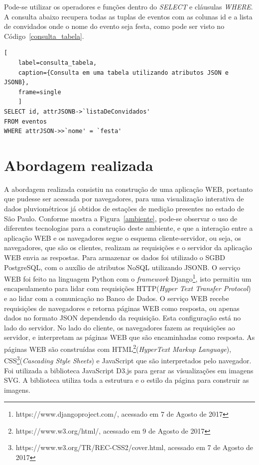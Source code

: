 \documentclass[article,11pt,oneside,a4paper]{abntex2} %
\begin{document}
	Pode-se utilizar os operadores e funções dentro do \textit{SELECT} e cláusulas \textit{WHERE}. A consulta abaixo recupera todas as tuplas de eventos com as colunas id e a lista de convidados onde o nome do evento seja festa, como pode ser visto no Código~\ref{consulta_tabela}.
	
	\begin{lstlisting}[
	label=consulta_tabela,
	caption={Consulta em uma tabela utilizando atributos JSON e JSONB},
	frame=single
	]
SELECT id, attrJSONB->`listaDeConvidados' 
FROM eventos 
WHERE attrJSON->>`nome' = `festa'
	\end{lstlisting}
	
	\section{Abordagem realizada}
		\hspace{13pt}
	A abordagem realizada consistiu na construção de uma aplicação WEB, portanto que pudesse ser acessada por navegadores, para uma visualização interativa de dados pluviométricos já obtidos de estações de medição presentes no estado de São Paulo. 
	Conforme mostra a Figura~\ref{ambiente}, pode-se observar o uso de diferentes tecnologias para a construção deste ambiente, e que a interação entre a aplicação WEB e os navegadores segue o esquema cliente-servidor, ou seja, os navegadores, que são os clientes, realizam as requisições e o servidor da aplicação WEB envia as respostas. Para armazenar os dados foi utilizado o SGBD PostgreSQL, com o auxílio de atributos NoSQL utilizando JSONB. O serviço WEB foi feito na linguagem Python com o \textit{framework} Django\footnote{https://www.djangoproject.com/, acessado em 7 de Agosto de 2017}, isto permitiu um encapsulamento para lidar com requisições HTTP(\textit{Hyper Text Transfer Protocol}) e ao lidar com a comunicação no Banco de Dados. O serviço WEB recebe requisições de navegadores e retorna páginas WEB como resposta, ou apenas dados no formato JSON dependendo da requisição. Esta configuração está no lado do servidor.
	No lado do cliente, os navegadores fazem as requisições ao servidor, e interpretam as páginas WEB que são encaminhadas como resposta. As páginas WEB são construídas com HTML\footnote{https://www.w3.org/html/, acessado em 9 de Agosto de 2017}(\textit{HyperText Markup Language}), CSS\footnote{https://www.w3.org/TR/REC-CSS2/cover.html, acessado em 7 de Agosto de 2017}(\textit{Cascading Style Sheets}) e JavaScript que são interpretados pelo navegador. Foi utilizada a biblioteca JavaScript D3.js para gerar as visualizações em imagens SVG. A biblioteca utiliza toda a estrutura e o estilo da página para construir as imagens.
\end{document}
